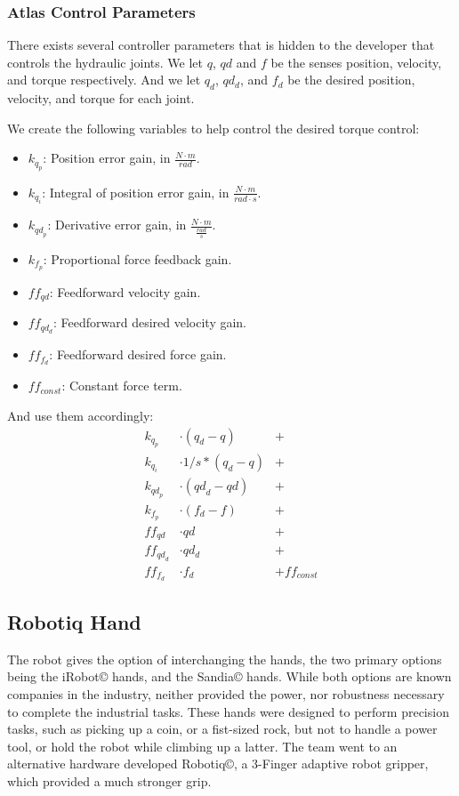 \documentclass[12pt]{report}
\begin{document}
\pagebreak


\subsubsection{Atlas Control Parameters}
There exists several controller parameters that is hidden to the developer that controls the hydraulic joints. We let $q$, $qd$ and $f$ be the senses position, velocity, and torque respectively. And we let $q_d$, $qd_d$, and $f_d$ be the desired position, velocity, and torque for each joint.

We create the following variables to help control the desired torque control:

\begin{itemize}
\item $k_{q_p}$: Position error gain, in $\frac{N \cdot m}{rad}$.
\item $k_{q_i} $: Integral of position error gain, in $\frac{N \cdot m}{rad \cdot s}$.
\item $k_{{qd}_p}$: Derivative error gain, in $\frac{N \cdot m}{\frac{rad}{s}}$.
\item $k_{f_p}$: Proportional force feedback gain.
\item ${ff}_{qd}$: Feedforward velocity gain.
\item ${ff}_{{qd}_d}$: Feedforward desired velocity gain.
\item ${ff}_{f_d}$: Feedforward desired force gain.
\item ${ff}_{const}$: Constant force term.
\end{itemize}

And use them accordingly: 
\begin{align*}
k_{q_p} &\cdot ( q_d - q ) &+\\
k_{q_i} &\cdot 1/s * ( q_d - q ) &+\\
k_{{qd}_p} &\cdot ( {qd}_d - qd ) &+\\
k_{f_p} &\cdot ( f_d - f ) &+\\
{ff}_{qd} &\cdot qd &+\\
{ff}_{{qd}_d} &\cdot qd_d &+\\
{ff}_{f_d} &\cdot f_d &+ {ff}_{const}
\end{align*}

\subsection{Robotiq Hand}

The robot gives the option of interchanging the hands, the two primary options being the iRobot© hands, and the Sandia© hands. While both options are known companies in the industry, neither provided the power, nor robustness necessary to complete the industrial tasks. These hands were designed to perform precision tasks, such as picking up a coin, or a fist-sized rock, but not to handle a power tool, or hold the robot while climbing up a latter. The team went to an alternative hardware developed Robotiq©, a 3-Finger adaptive robot gripper, which provided a much stronger grip. 
\end{document}
